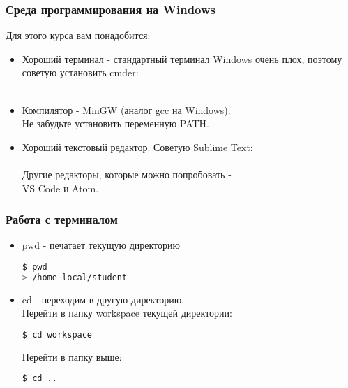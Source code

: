 \documentclass[12pt,pdf,hyperref={unicode}]{beamer}
\begin{document}
\begin{frame}[fragile]
\frametitle{Среда программирования на Windows}
Для этого курса вам понадобится:
\begin{itemize}
\item Хороший терминал - стандартный терминал Windows очень плох, поэтому советую установить cmder:\\
\href{https://cmder.net/}{\color{blue}{cmder.net}} \\
\item Компилятор - MinGW (аналог gcc на Windows).
\href{http://www.mingw.org/}{\color{blue}{mingw.org}}\\
Не забудьте установить переменную PATH.
\item Хороший текстовый редактор. Советую Sublime Text:\\
\href{https://www.sublimetext.com/}{\color{blue}{sublimetext.com}} \\
Другие редакторы, которые можно попробовать - \\VS Code и Atom.
\end{itemize}
\end{frame}

\begin{frame}[fragile]
\frametitle{Работа с терминалом}
\begin{itemize}
\item pwd - печатает текущую директорию
\begin{lstlisting}[language=bash,backgroundcolor=\color{bashcolor}]
$ pwd
> /home-local/student
\end{lstlisting}
\item cd - переходим в другую директорию.\\
Перейти в папку workspace текущей директории:
\begin{lstlisting}[language=bash,backgroundcolor=\color{bashcolor}]
$ cd workspace
\end{lstlisting}
Перейти в папку выше:
\begin{lstlisting}[language=bash,backgroundcolor=\color{bashcolor}]
$ cd ..
\end{lstlisting}
\end{itemize}
\end{frame}
\end{document}
